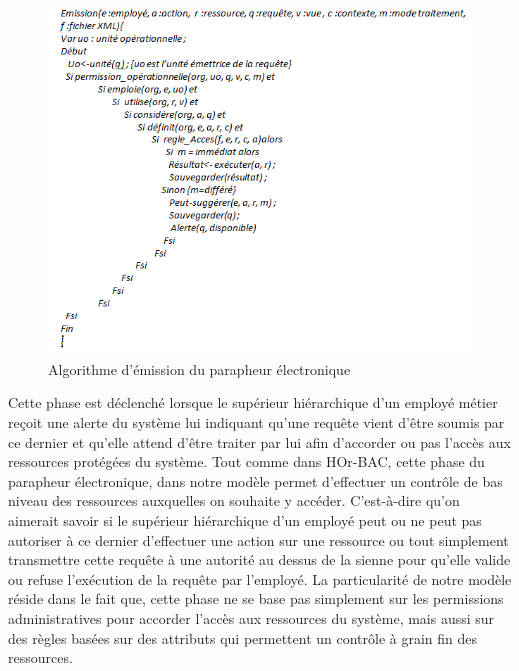 \begin{figure}[h!]
    \centering
		\includegraphics[scale=0.7]{chap3/images/emission.png}
    \caption{Algorithme d'émission du parapheur électronique}
	 \label{figemission}
\end{figure} 

\label{sectionPhasetraitement}

Cette phase est déclenché lorsque le supérieur hiérarchique d'un employé métier reçoit une alerte du système lui indiquant qu'une requête vient d'être soumis par ce dernier et qu'elle attend d'être traiter par lui afin d'accorder ou pas l'accès aux ressources protégées du système. Tout comme dans HOr-BAC, cette phase du parapheur électronique, dans notre modèle permet d'effectuer un contrôle de bas niveau des ressources auxquelles on souhaite y accéder. C'est-à-dire qu'on aimerait savoir si le supérieur hiérarchique d'un employé peut ou ne peut pas autoriser à ce dernier d'effectuer une action sur une ressource ou tout simplement transmettre cette requête à une autorité au dessus de la sienne pour qu'elle valide ou refuse l'exécution de la requête par l'employé. La particularité de notre modèle réside dans le fait que, cette phase ne se base pas simplement sur les permissions administratives pour accorder l'accès aux ressources du système, mais aussi sur des règles basées sur des attributs qui permettent un contrôle à grain fin des ressources. 

